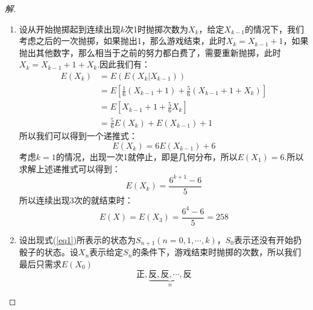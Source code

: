 \documentclass[12pt]{article}
\begin{document}
\begin{enumerate}
\begin{proof}[解]
	\begin{enumerate}
		\item 设从开始抛掷起到连续出现$k$次1时抛掷次数为$X_k$，给定$X_{k-1}$的情况下，我们考虑之后的一次抛掷，如果抛出1，那么游戏结束，此时$X_k=X_{k-1}+1$，如果抛出其他数字，那么相当于之前的努力都白费了，需要重新抛掷，此时$X_k=X_{k-1}+1+X_k$.因此我们有：
		\begin{equation}
		\begin{aligned}
		E(X_k)&=E(E(X_k|X_{k-1})) \\
		&=E\left[\frac{1}{6}(X_{k-1}+1)+\frac{5}{6}(X_{k-1}+1+X_{k})\right] \\
		&=E\left[X_{k-1}+1+\frac{5}{6}X_k\right] \\
		&=\frac{5}{6}E(X_k)+E(X_{k-1})+1
		\end{aligned}
		\end{equation}
		所以我们可以得到一个递推式：
		\begin{equation}
		E(X_k)=6E(X_{k-1})+6
		\end{equation}
		考虑$k=1$的情况，出现一次1就停止，即是几何分布，所以$E(X_1)=6$.所以求解上述递推式可以得到：
		\begin{equation}
		E(X_k)=\frac{6^{k+1}-6}{5}
		\end{equation}
		所以连续出现3次的就结束时：
		\begin{equation}
		E(X)=E(X_3)=\frac{6^4-6}{5}=258
		\end{equation}
		
		\item 设出现式(\ref{eq1})所表示的状态为$S_{n+1}(n=0,1,\cdots,k)$，$S_0$表示还没有开始扔骰子的状态。设$X_n$表示给定$S_{n}$的条件下，游戏结束时抛掷的次数，所以我们最后只需求$E(X_0)$
		\begin{equation}
		\label{eq1}
		\mbox{正},\underbrace{\mbox{反},\mbox{反},\cdots,\mbox{反}}_n
		\end{equation}
		

\end{enumerate}
\end{proof}
\end{enumerate}
\end{document}
